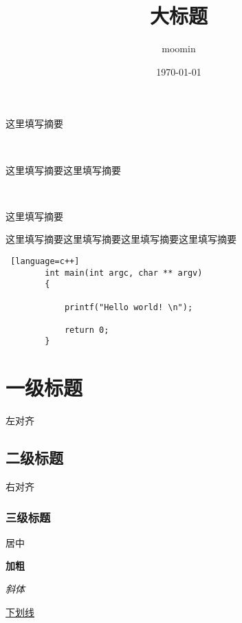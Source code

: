 \documentclass{article}
\title{大标题}
\author{moomin}
\date{\today}
\begin{document}
	\maketitle %

	\tableofcontents

	这里填写摘要

	~ %

	这里填写摘要这里填写摘要

	~

	这里填写摘要

	\vspace{7cm} %

	这里填写摘要这里填写摘要这里填写摘要这里填写摘要

	\begin{lstlisting} [language=c++]
		int main(int argc, char ** argv) 
		{ 

			printf("Hello world! \n"); 

			return 0; 
		} 
		\end{lstlisting}

	\newpage

	\section{一级标题}

	\begin{flushleft}
	左对齐
	\end{flushleft}

	\newpage

	\subsection{二级标题}

	\begin{flushright}
	右对齐
	\end{flushright}

	\subsubsection{三级标题}

	\begin{center}
	居中
	\end{center}

	\textbf{加粗}

	\textit{斜体}

	\underline{下划线}
\end{document}
